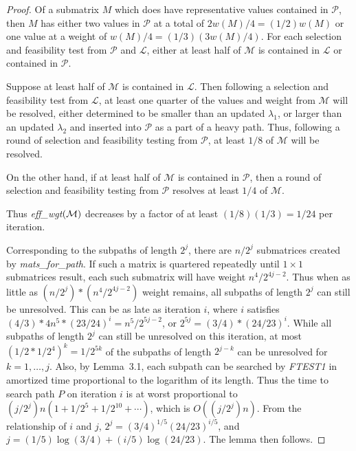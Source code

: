 \documentclass[12pt]{article}
\begin{document}
\begin{spacing}{1.5}
\begin{proof}
Of a submatrix $M$ which does have representative values contained in $\mathcal{P}$, 
then $M$ has either two values in $\mathcal{P}$ 
at a total of $2w(M)/4 = (1/2)w(M)$ 
or one value at a weight of $w(M)/4 = (1/3)(3w(M)/4)$. 
For each selection and feasibility test from $\mathcal{P}$ and $\mathcal{L}$, either 
at least half of $\mathcal{M}$ is contained in $\mathcal{L}$ or contained in $\mathcal{P}$. 

Suppose at least half of $\mathcal{M}$ is contained in $\mathcal{L}$. 
Then following a selection and feasibility test from $\mathcal{L}$, at least one quarter of the 
values and weight from $\mathcal{M}$ will be resolved, either determined to be smaller than an updated $\lambda_1$, 
or larger than an updated $\lambda_2$ and inserted into $\mathcal{P}$ as a part of a heavy path. 
Thus, following a round of selection and feasibility testing from $\mathcal{P}$, at least $1/8$ of $\mathcal{M}$ will be resolved.

On the other hand, if at least half of $\mathcal{M}$ is contained in $\mathcal{P}$, then a round of selection and feasibility testing 
from $\mathcal{P}$ resolves at least $1/4$ of $\mathcal{M}$.

Thus {\it eff\_wgt}$(\cal M )$
decreases by a factor of at least $(1/8)(1/3) = 1/24$ per iteration.

Corresponding to the subpaths of length $2^j$,
there are $n/2^j$ submatrices created by {\it mats\_for\_path}.
If such a matrix is quartered repeatedly until $1 \times 1$ submatrices result,
each such submatrix will have weight $n^4/2^{4j-2}$.
Thus when as little as $(n/2^j)*(n^4/2^{4j-2})$ weight remains,
all subpaths of length $2^j$ can still be unresolved.
This can be as late as iteration $i$,
where $i$ satisfies
$(4/3)*4n^5*(23/24)^i = n^5/2^{5j-2}$,
or $2^{5j}=(3/4)*(24/23)^i$.
While all subpaths of length $2^j$ can still be unresolved on this iteration,
at most $(1/2*1/2^4)^k = 1/2^{5k}$ of the subpaths of length $2^{j-k}$
can be unresolved for $k= 1, \ldots, j$.
Also, by Lemma~3.1, each subpath can be searched by {\it FTEST1}
in amortized time proportional to the logarithm of its length.
Thus the time to search path $P$ on iteration $i$ is at worst proportional to
$(j/2^j)n(1 + 1/2^5 + 1/2^{10} + \cdots )$,
which is $O((j/2^j)n)$.
From the relationship of $i$ and $j$,
$2^j = (3/4)^{1/5}(24/23)^{i/5}$,
and $j = (1/5)\log(3/4) + (i/5)\log (24/23)$.
The lemma then follows.
\end{proof}

\end{spacing}
\end{document}

